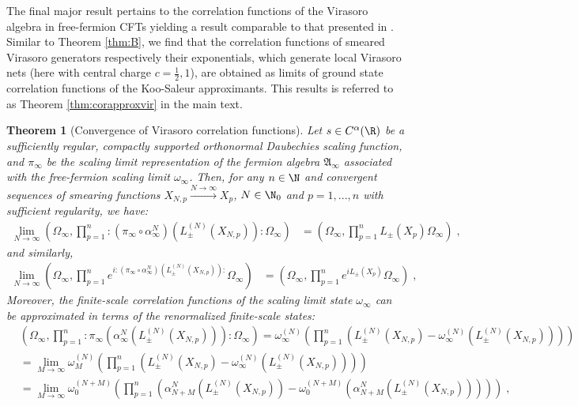 \documentclass[a4paper, 11pt]{article}
\newcommand{\fA}{\mathfrak{A}}\newcommand{\cA}{\mathcal{A}}\newcommand{\dA}{\mathds{A}}\newcommand{\sA}{\mathscr{A}}
\DeclareMathOperator{\1}{\mathds{1}}
\newtheorem{letterthm}{Theorem}
\begin{document}
The final major result pertains to the correlation functions of the Virasoro algebra in free-fermion CFTs yielding a result comparable to that presented in \cite{ZiniConformalFieldTheories}. Similar to Theorem \ref{thm:B}, we find that the correlation functions of smeared Virasoro generators respectively their exponentials, which generate local Virasoro nets \cite{BrunettiModularStructureAnd, GabbianiOperatorAlgebrasAnd} (here with central charge $c=\tfrac{1}{2},1$), are obtained as limits of ground state correlation functions of the Koo-Saleur approximants. This results is referred to as Theorem \ref{thm:corapproxvir} in the main text.
\begin{letterthm}[Convergence of Virasoro correlation functions]
\label{thm:C}
Let $s\in C^{\alpha}(\R)$ be a sufficiently regular, compactly supported orthonormal Daubechies scaling function, and $\pi_{\infty}$ be the scaling limit representation of the fermion algebra $\fA_{\infty}$ associated with the free-fermion scaling limit $\omega_{\infty}$. Then, for any $n\in\N$ and convergent sequences of smearing functions $X_{N,p}\stackrel{N\rightarrow\infty}{\rightarrow} X_{p}$, $N\in\N_{0}$ and $p=1,...,n$ with sufficient regularity, we have:
\begin{align*}
\lim_{N\rightarrow\infty}(\Omega_{\infty},\prod_{p=1}^{n}:\!(\pi_{\infty}\circ\alpha^{N}_{\infty})(L^{(N)}_{\pm}(X_{N,p}))\!:\Omega_{\infty}) & = (\Omega_{\infty},\prod_{p=1}^{n}L_{\pm}(X_{p})\Omega_{\infty})\;,
\end{align*}
and similarly,
\begin{align*}
\lim_{N\rightarrow\infty}(\Omega_{\infty},\prod_{p=1}^{n}e^{i:(\pi_{\infty}\circ\alpha^{N}_{\infty})(L^{(N)}_{\pm}(X_{N,p})):}\Omega_{\infty}) & = (\Omega_{\infty},\prod_{p=1}^{n}e^{iL_{\pm}(X_{p})}\Omega_{\infty})\;,
\end{align*}
Moreover, the finite-scale correlation functions of the scaling limit state $\omega_{\infty}$ can be approximated in terms of the renormalized finite-scale states:
\begin{align*}
& (\Omega_{\infty},\prod_{p=1}^{n}:\!\pi_{\infty}(\alpha^{N}_{\infty}(L^{(N)}_{\pm}(X_{N,p})\!)\!)\!:\Omega_{\infty}) = \omega^{(N)}_{\infty}(\prod_{p=1}^{n}(L^{(N)}_{\pm}(X_{N,p})-\omega^{(N)}_{\infty}(L^{(N)}_{\pm}(X_{N,p})\!)\!)\!) \\
& = \lim_{M\rightarrow\infty}\omega^{(N)}_{M}(\prod_{p=1}^{n}(L^{(N)}_{\pm}(X_{N,p})-\omega^{(N)}_{\infty}(L^{(N)}_{\pm}(X_{N,p})\!)\!)\!) \\
& = \lim_{M\rightarrow\infty}\omega^{(N+M)}_{0}\!(\prod_{p=1}^{n}(\alpha^{N}_{N+M}(L^{(N)}_{\pm}\!(X_{N,p})\!)\!-\!\omega^{(N+M)}_{0}\!(\alpha^{N}_{N+M}(L^{(N)}_{\pm}\!(X_{N,p})\!)\!)\!)\!) \;,

\end{align*}
\end{letterthm}
\end{document}
